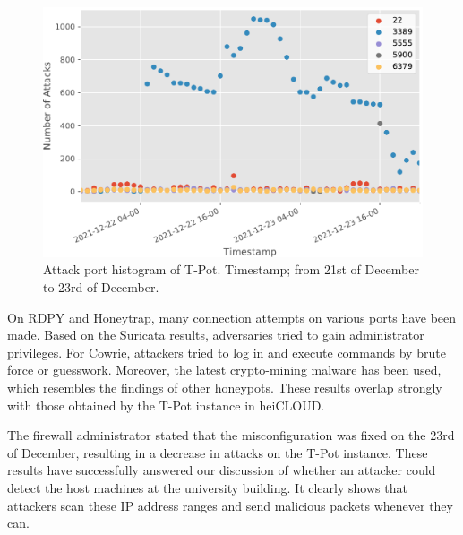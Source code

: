 \begin{figure}[ht]
    \centering
    \includegraphics[width=\textwidth]{figures/tpot-misconfig-port.pdf}
    \caption[Attack port histogram of T-Pot]{
        Attack port histogram of T-Pot.
        Timestamp; from 21st of December to 23rd of December.
    }
    \label{fig:tpot-misconfig-port-histogram}
\end{figure}

On RDPY and Honeytrap, many connection attempts on various ports have been made.
Based on the Suricata results, adversaries tried to gain administrator privileges.
For Cowrie, attackers tried to log in and execute commands by brute force or guesswork.
Moreover, the latest crypto-mining malware has been used, which resembles the findings of other honeypots.
These results overlap strongly with those obtained by the T-Pot instance in heiCLOUD.

The firewall administrator stated that the misconfiguration was fixed on the 23rd of December, resulting in a decrease in attacks on the T-Pot instance.
These results have successfully answered our discussion of whether an attacker could detect the host machines at the university building.
It clearly shows that attackers scan these IP address ranges and send malicious packets whenever they can.

